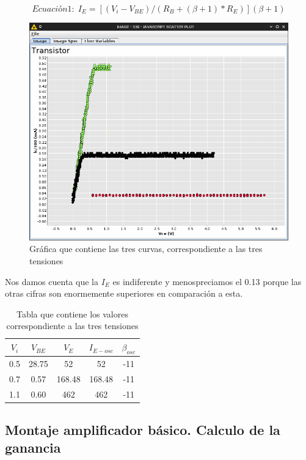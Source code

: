 \documentclass[paper=a4, fontsize=11pt]{scrartcl} %
\numberwithin{equation}{section} %
\numberwithin{figure}{section} %
\numberwithin{table}{section} %
\begin{document}
$$ Ecuación 1: \; I_{E}=[ (V_{i}-V_{BE})/(R_{B}+(\beta +1)*R_{E}) ] (\beta +1) $$

\begin{figure}[H]
	\centering
	\includegraphics[scale=0.4]{image/transistor}
	\caption{Gráfica que contiene las tres curvas, correspondiente a las tres tensiones}
	\label{fig:Gráfica-prac-4A}
\end{figure}

Nos damos cuenta que la $ I_{E} $ es indiferente y menospreciamos el 0.13 porque las otras cifras son enormemente superiores en comparación a esta.

\begin{table}[H]
	\centering
	\begin{tabular}{|c|c|c|c|c|}
		\hline
		$ V_{i} $ & $ V_{BE} $ & $ V_{E} $ & $ I_{E-osc} $ & $ \beta_{osc} $ \\
		\hline \hline
			0.5 & 28.75 & 52 & 52 & -11 \\
			0.7 & 0.57 & 168.48 & 168.48 & -11 \\
			1.1 & 0.60 & 462 & 462 & -11 \\
		\hline
	\end{tabular}
	\caption{Tabla que contiene los valores correspondiente a las tres tensiones}
	\label{fig:Tabla-prac-4A}
\end{table}

\subsection{Montaje amplificador básico. Calculo de la ganancia \cite{2c}}
\end{document}
